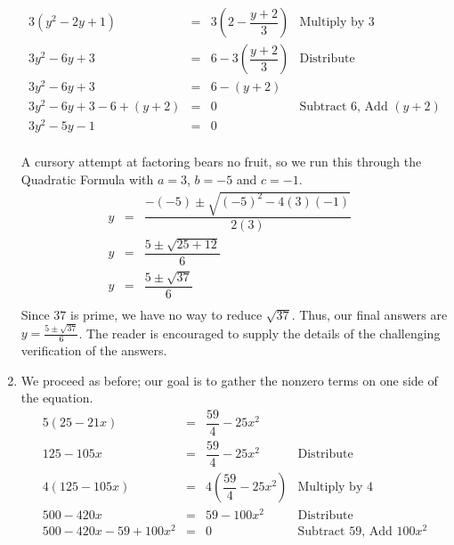\documentclass{ximera}
\begin{document}
\begin{example}
\begin{enumerate}
\[\begin{array}{rclr}
3(y^2 - 2y + 1) & = & 3\left(2 - \dfrac{y+2}{3} \right) & \text{Multiply by $3$} \\ [10pt]
3y^2 - 6y + 3 & = & 6 - 3\left(\dfrac{y+2}{3}\right) & \text{Distribute} \\ [8pt]

3y^2 - 6y + 3 & = & 6 - (y+2) & \\

3y^2 - 6y + 3 - 6 + (y+2) & = & 0 & \text{Subtract $6$, Add $(y+2)$}\\

3y^2 - 5y - 1 & = & 0 & \\

\end{array}\]

A cursory attempt at factoring bears no fruit, so we run this through the Quadratic Formula with $a = 3$, $b = -5$ and $c = -1$. \[ \begin{array}{rclr}

y & = & \dfrac{-(-5) \pm \sqrt{(-5)^2 - 4(3)(-1)}}{2(3)} & \\ [8pt]

y & = & \dfrac{5 \pm \sqrt{25 + 12}}{6} & \\[8pt]

y & = & \dfrac{5 \pm \sqrt{37}}{6} & \\

\end{array} \] Since $37$ is prime, we have no way to reduce $\sqrt{37}$.  Thus, our final answers are $y = \frac{5 \pm \sqrt{37}}{6}$. The reader is encouraged to supply the details of the challenging verification of the answers.

\item  We proceed as before; our goal is to gather the nonzero terms on one side of the equation. \[ \begin{array}{rclr}

5(25 - 21x) & = &  \dfrac{59}{4} - 25x^2 & \\ [10pt]

125 - 105x & = & \dfrac{59}{4} - 25x^2 & \text{Distribute} \\ [10pt]

4(125 - 105x) & = & 4\left(\dfrac{59}{4} - 25x^2 \right) & \text{Multiply by $4$} \\ [10pt]

500 - 420x & = & 59 - 100x^2 & \text{Distribute} \\ [10pt]

500 - 420x - 59 + 100x^2 & = & 0 & \text{Subtract $59$, Add $100x^2$} \\ [10pt]


\end{array}\]
\end{enumerate}
\end{example}
\end{document}

